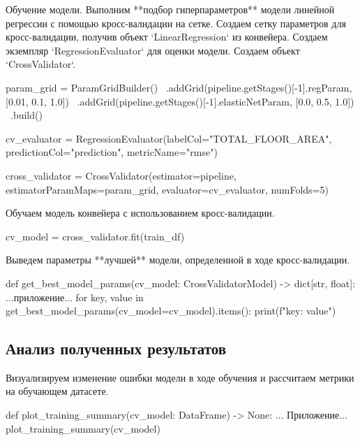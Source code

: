 \par Обучение модели.
Выполним **подбор гиперпараметров** модели линейной регрессии с помощью кросс-валидации на сетке. 
Создаем сетку параметров для кросс-валидации, получив объект `LinearRegression` из конвейера.
Создаем экземпляр `RegressionEvaluator` для оценки модели.
Создаем объект `CrossValidator`.
\begin{code}
param_grid = ParamGridBuilder() \
    .addGrid(pipeline.getStages()[-1].regParam, [0.01, 0.1, 1.0]) \
    .addGrid(pipeline.getStages()[-1].elasticNetParam, [0.0, 0.5, 1.0]) \
    .build()
    
cv_evaluator = RegressionEvaluator(labelCol="TOTAL_FLOOR_AREA",
                                   predictionCol="prediction",
                                   metricName="rmse")
                                   
cross_validator = CrossValidator(estimator=pipeline,
                                 estimatorParamMaps=param_grid,
                                 evaluator=cv_evaluator,
                                 numFolds=5)
\end{code}

Обучаем модель конвейера с использованием кросс-валидации.
\begin{code}
cv_model = cross_validator.fit(train_df)
\end{code}

Выведем параметры **лучшей** модели, определенной в ходе кросс-валидации.
\begin{code}
def get_best_model_params(cv_model: CrossValidatorModel) -> dict[str, float]: ...приложение...
for key, value in get_best_model_params(cv_model=cv_model).items():
    print(f"{key}: {value}")
\end{code}



\vspace{\baselineskip}\subsection{Анализ полученных результатов}\vspace{\baselineskip}

Визуализируем изменение ошибки модели в ходе обучения и рассчитаем метрики на обучающем датасете.
\begin{code}
def plot_training_summary(cv_model: DataFrame) -> None: ... Приложение...
plot_training_summary(cv_model)
\end{code}

